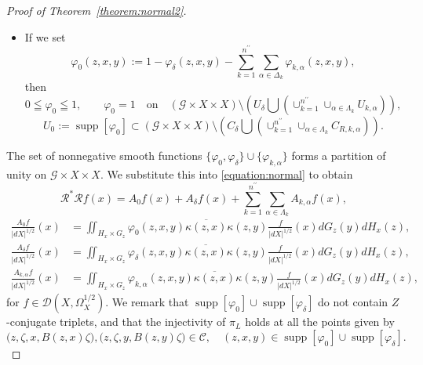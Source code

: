 \documentclass[a4paper,11pt,reqno]{amsart}
\theoremstyle{definition}
\theoremstyle{remark}
\begin{document}
\begin{proof}[Proof of Theorem~\ref{theorem:normal2}]
\begin{itemize}
\begin{alignat*}{3}
  \varphi_{k,\alpha}
& =
  1 
  \quad\text{on}\quad
  C_{k,\alpha},
& \quad
  \operatorname{supp}[\varphi_\delta]
& \subset
  U_{k,\alpha}. 
\end{alignat*}
%
%
\item 
If we set 
%
%
$$
\varphi_0(z,x,y)
:=
1
-
\varphi_\delta(z,x,y)
-
\sum_{k=1}^{n^{\prime\prime}}
\sum_{\alpha \in \Delta_k}
\varphi_{k,\alpha}(z,x,y),
$$
%
%
then 
%
%
$$
0 \leqq \varphi_0 \leqq 1,
\qquad 
\varphi_0=1
\quad\text{on}\quad
(\mathcal{G}{\times}X{\times}X)\setminus \left(U_\delta \bigcup \left(\displaystyle\cup_{k=1}^{n^{\prime\prime}}\displaystyle\cup_{\alpha\in\Lambda_k}U_{k,\alpha}\right)\right), 
$$
%
%
$$
U_0
:=
\operatorname{supp}[\varphi_0]
\subset
(\mathcal{G}{\times}X{\times}X)\setminus \left(C_\delta \bigcup \left(\displaystyle\cup_{k=1}^{n^{\prime\prime}}\displaystyle\cup_{\alpha\in\Lambda_k}C_{R,k,\alpha}\right)\right).
$$
%
%
\end{itemize}
%
%
The set of nonnegative smooth functions 
$\{\varphi_0,\varphi_\delta\}\cup\{\varphi_{k,\alpha}\}$ 
forms a partition of unity on $\mathcal{G}{\times}X{\times}X$. 
We substitute this into \eqref{equation:normal} to obtain 
%
%
$$
\mathcal{R}^\ast\mathcal{R}f(x)
=
A_0f(x)+A_\delta{f}(x)
+
\sum_{k=1}^{n^{\prime\prime}}
\sum_{\alpha \in \Lambda_k}
A_{k,\alpha}f(x),  
$$
%
%
\begin{align}
  \frac{A_0 f}{\lvert{dX}\rvert^{1/2}}(x)
& =
  \iint_{H_x{\times}G_z}
  \varphi_0(z,x,y)
  \overline{\kappa(z,x)}\kappa(z,y)
  \frac{f}{\lvert{dX}\rvert^{1/2}}(x)
  dG_z(y)
  dH_x(z),
\nonumber
\\
  \frac{A_\delta f}{\lvert{dX}\rvert^{1/2}}(x)
& =
  \iint_{H_x{\times}G_z}
  \varphi_\delta(z,x,y)
  \overline{\kappa(z,x)}\kappa(z,y)
  \frac{f}{\lvert{dX}\rvert^{1/2}}(x)
  dG_z(y)
  dH_x(z),
\nonumber
\\ 
  \frac{A_{k,\alpha} f}{\lvert{dX}\rvert^{1/2}}(x)
& =
  \iint_{H_x{\times}G_z}
  \varphi_{k,\alpha}(z,x,y)
  \overline{\kappa(z,x)}\kappa(z,y)
  \frac{f}{\lvert{dX}\rvert^{1/2}}(x)
  dG_z(y)
  dH_x(z),
\label{equation:target}
\end{align}
%
%
for $f \in \mathscr{D}(X,\Omega_X^{1/2})$. 
We remark that 
$\operatorname{supp}[\varphi_0]\cup\operatorname{supp}[\varphi_\delta]$ 
do not contain $Z$-conjugate triplets, 
and that the injectivity of $\pi_L$ holds at all the points given by 
%
%
\begin{equation}
\bigl(z,\zeta,x,B(z,x)\zeta\bigr), 
\bigl(z,\zeta,y,B(z,y)\zeta\bigr) 
\in 
\mathcal{C}, 
\quad
(z,x,y) \in \operatorname{supp}[\varphi_0]\cup\operatorname{supp}[\varphi_\delta]. 

\end{equation}
\end{proof}
\end{document}
